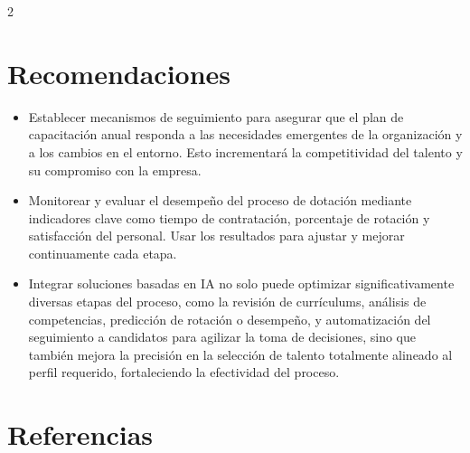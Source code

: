 \documentclass[12pt,spanish,Letterpaper,openany]{book}
\providecommand{\tightlist}{%
  \setlength{\itemsep}{0pt}\setlength{\parskip}{0pt}}
\begin{document}
\begin {multicols}{2}
\hypertarget{recomendaciones}{%
\section{Recomendaciones}\label{recomendaciones}}

\begin{itemize}
\item
  Establecer mecanismos de seguimiento para asegurar que el plan de capacitación anual responda a las necesidades emergentes de la organización y a los cambios en el entorno. Esto incrementará la competitividad del talento y su compromiso con la empresa.
\item
  Monitorear y evaluar el desempeño del proceso de dotación mediante indicadores clave como tiempo de contratación, porcentaje de rotación y satisfacción del personal. Usar los resultados para ajustar y mejorar continuamente cada etapa.
\end{itemize}

\bigskip
\bigskip
\bigskip
\bigskip
\bigskip
\bigskip

\begin{itemize}
\tightlist
\item
  Integrar soluciones basadas en IA no solo puede optimizar significativamente diversas etapas del proceso, como la revisión de currículums, análisis de competencias, predicción de rotación o desempeño, y automatización del seguimiento a candidatos para agilizar la toma de decisiones, sino que también mejora la precisión en la selección de talento totalmente alineado al perfil requerido, fortaleciendo la efectividad del proceso.
\end{itemize}

\hypertarget{referencias-3}{%
\section{Referencias}\label{referencias-3}}


\end{multicols}
\end{document}
